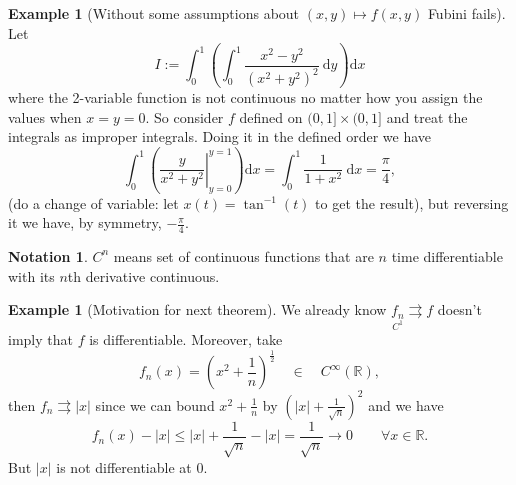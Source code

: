\documentclass[a4paper]{article}
\theoremstyle{definition}
\newtheorem{example}[defn]{Example}
\newtheorem*{notation}{Notation}
\begin{document}
\begin{example}[Without some assumptions about $(x,y)\mapsto f(x,y)$ Fubini fails]
Let
\[
I:=\int_0^1 \left( \int_0^1 \frac{x^2-y^2}{(x^2+y^2)^2} \ \mathrm d y\right) \mathrm d x
\]
where the 2-variable function is not continuous no matter how you assign the values when $x=y=0$. So consider $f$ defined on $(0,1]\times (0,1]$ and treat the integrals as improper integrals. Doing it in the defined order we have
\[
\int_0^1\left( \left. \frac{y}{x^2+y^2}\right|_{y=0}^{y=1} \right) \mathrm d x=\int_0^1 \frac{1}{1+x^2} \ \mathrm d x = \frac{\pi}{4},
\]
(do a change of variable: let $x(t)=\tan ^{-1}(t)$ to get the result), but reversing it we have, by symmetry, $-\frac{\pi}{4}$.
\end{example}
\begin{notation}
$C^n$ means set of continuous functions that are $n$ time differentiable with its $n$th derivative continuous.
\end{notation}

\begin{example}[Motivation for next theorem]
We already know $\underset{C^1}{f_n} \rightrightarrows f$ doesn't imply that $f$ is differentiable. Moreover, take
\[
f_n(x)=\left(x^2+\frac{1}{n}\right)^{\frac12} \quad \in \quad C^\infty (\mathbb R),
\]
then $f_n \rightrightarrows |x|$ since we can bound $x^2+\frac{1}{n}$ by $\left(|x|+\frac{1}{\sqrt n} \right)^2$ and we have
\[
f_n(x)-|x|\leq |x|+\frac{1}{\sqrt n}-|x|=\frac{1}{\sqrt n}\rightarrow 0 \qquad \forall x\in \mathbb R .
\]
But $|x|$ is not differentiable at 0.
\begin{center}
\end{center}
\end{example}
\end{document}
